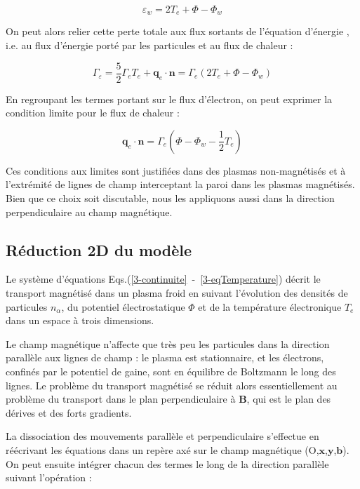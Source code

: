 \begin{refsection}
\begin{equation}
	\varepsilon_w=2T_e+\Phi-\Phi_w
\end{equation}
 
 On peut alors relier cette perte totale aux flux sortants de l'équation
 d'énergie , i.e. au flux d'énergie porté
 par les particules et au flux de chaleur :
 
\begin{equation}
\Gamma_\varepsilon=\frac{5}{2}{\Gamma}_eT_e+\mathbf{q}_e\cdot\mathbf{n}=
\Gamma_e\left(2T_e+\Phi-\Phi_w\right)
\end{equation}

En regroupant les termes portant sur le flux d'électron, on peut exprimer la
condition limite pour le flux de chaleur :

\begin{equation}
\mathbf{q}_e\cdot\mathbf{n}=\Gamma_e\left(\Phi-\Phi_w-\frac{1}{2}T_e\right)
\end{equation}

Ces conditions aux limites sont justifiées dans des plasmas non-magnétisés et à l'extrémité
de lignes de champ interceptant la paroi dans les plasmas magnétisés. Bien
que ce choix soit discutable, nous les appliquons aussi dans la direction
perpendiculaire au champ magnétique.


\subsection{Réduction 2D du modèle}

Le système d'équations Eqs.(\ref{3-continuite}~-~\ref{3-eqTemperature}) décrit le
transport magnétisé dans un plasma froid en suivant l'évolution des densités de
particules $n_\alpha$, du potentiel électrostatique $\Phi$ et de la
température électronique $T_e$ dans un espace à trois dimensions. 

Le champ magnétique n'affecte que très peu les particules dans la direction
parallèle aux lignes de champ : le plasma est stationnaire, et les électrons,
confinés par le potentiel de gaine, sont en équilibre de Boltzmann le long des
lignes.
Le problème du transport magnétisé se réduit alors essentiellement au problème du transport
dans le plan perpendiculaire à $\mathbf B$, qui est le plan des dérives et des
forts gradients.

La dissociation des mouvements parallèle et perpendiculaire s'effectue
en réécrivant les équations dans un repère axé sur le champ magnétique
(O,$\mathbf x$,$\mathbf y$,$\mathbf b$). On peut ensuite intégrer chacun des
termes le long de la direction parallèle suivant l'opération :


\end{refsection}
